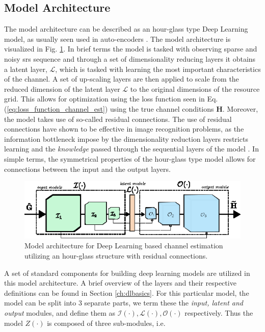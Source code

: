 \subsection{Model Architecture}
The model architecture can be described as an hour-glass type Deep Learning model, as usually seen used in auto-encoders \cite{Nielsen2015}. The model architecture is visualized in Fig. \ref{fig:model_architecture_channel_estimation}. In brief terms the model is tasked with observing sparse and noisy \gls{srs} sequence and through a set of dimensionality reducing layers it obtains a latent layer, $\mathcal{L}$, which is tasked with learning the most important characteristics of the channel. A set of up-scaling layers are then applied to scale from the reduced dimension of the latent layer $\mathcal{L}$ to the original dimensions of the resource grid. This allows for optimization using the loss function seen in Eq. (\ref{eq:loss_function_channel_est}) using the true channel conditions $\mathbf{H}$. Moreover, the model takes use of so-called residual connections. The use of residual connections have shown to be effective in image recognition problems, as the information bottleneck impose by the dimensionality reduction layers restricts learning and the \emph{knowledge} passed through the sequential layers of the model \cite{He2016DeepRecognition}. In simple terms, the symmetrical properties of the hour-glass type model allows for connections between the input and the output layers. 

\begin{figure}
    \centering
    \includegraphics{chapters/part_uplink/figures/model_architecture.eps}
    \caption{Model architecture for Deep Learning based channel estimation utilizing an hour-glass structure with residual connections.}
    \label{fig:model_architecture_channel_estimation}
\end{figure}

A set of standard components for building deep learning models are utilized in this model architecture. A brief overview of the layers and their respective definitions can be found in Section \ref{ch:dlbasics}. For this particular model, the model can be split into 3 separate parts, we term these the \emph{input, latent and output} modules, and define them as $\mathcal{I}(\cdot), \mathcal{L}(\cdot), \mathcal{O}(\cdot)$ respectively. Thus the model $Z(\cdot)$ is composed of three sub-modules, i.e. 

